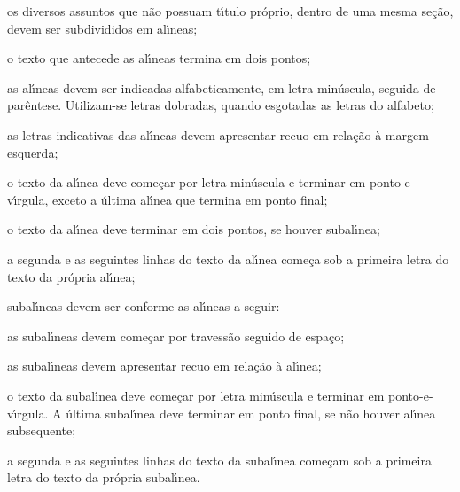 \begin{alineas}

  \item os diversos assuntos que n\~{a}o possuam t\'{\i}tulo pr\'{o}prio, dentro de uma mesma
  se\c{c}\~{a}o, devem ser subdivididos em al\'{\i}neas;

  \item o texto que antecede as al\'{\i}neas termina em dois pontos;
  \item as al\'{\i}neas devem ser indicadas alfabeticamente, em letra min\'{u}scula,
  seguida de par\^{e}ntese. Utilizam-se letras dobradas, quando esgotadas as
  letras do alfabeto;

  \item as letras indicativas das al\'{\i}neas devem apresentar recuo em rela\c{c}\~{a}o \`{a}
  margem esquerda;

  \item o texto da al\'{\i}nea deve come\c{c}ar por letra min\'{u}scula e terminar em
  ponto-e-v\'{\i}rgula, exceto a \'{u}ltima al\'{\i}nea que termina em ponto final;

  \item o texto da al\'{\i}nea deve terminar em dois pontos, se houver subal\'{\i}nea;

  \item a segunda e as seguintes linhas do texto da al\'{\i}nea come\c{c}a sob a
  primeira letra do texto da pr\'{o}pria al\'{\i}nea;

  \item subal\'{\i}neas \cite[4.3]{NBR6024:2012} devem ser conforme as al\'{\i}neas a
  seguir:

  \begin{alineas}
     \item as subal\'{\i}neas devem come\c{c}ar por travess\~{a}o seguido de espa\c{c}o;

     \item as subal\'{\i}neas devem apresentar recuo em rela\c{c}\~{a}o \`{a} al\'{\i}nea;

     \item o texto da subal\'{\i}nea deve come\c{c}ar por letra min\'{u}scula e terminar em
     ponto-e-v\'{\i}rgula. A \'{u}ltima subal\'{\i}nea deve terminar em ponto final, se n\~{a}o
     houver al\'{\i}nea subsequente;

     \item a segunda e as seguintes linhas do texto da subal\'{\i}nea come\c{c}am sob a
     primeira letra do texto da pr\'{o}pria subal\'{\i}nea.
  \end{alineas}


\end{alineas}
